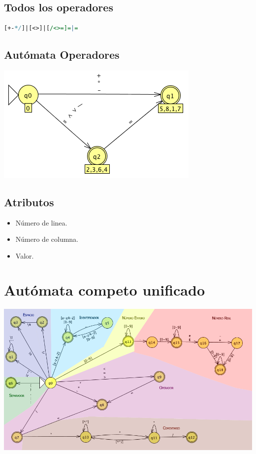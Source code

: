         \subsection{Todos los operadores}

            \begin{lstlisting}[language=Perl]
[+-*/]|[<>]|[/<>=]=|=
            \end{lstlisting}

        \subsection{Autómata Operadores}

            \includegraphics[scale=.7]{../Design/jflap/Operadores.png}

        \subsection{Atributos}

            \begin{itemize}
                \item Número de linea.
                \item Número de columna.
                \item Valor.
            \end{itemize}

            \hfill
            \clearpage



\section{Autómata competo unificado}

         \hspace{-2.8em}\includegraphics[scale=.61]{../Design/jflap/automata.png}

